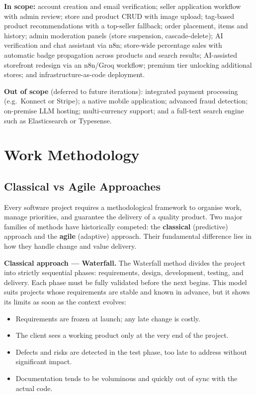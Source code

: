 \documentclass[12pt, a4paper, oneside]{report}
\begin{document}
\noindent\textbf{In scope:} account creation and email verification;
seller application workflow with admin review; store and product
CRUD with image upload; tag-based product recommendations with a
top-seller fallback; order placement, items and history; admin
moderation panels (store suspension, cascade-delete); AI verification and chat assistant via n8n;
store-wide percentage sales with automatic badge propagation across products and search results;
AI-assisted storefront redesign via an n8n/Groq workflow;
premium tier unlocking additional stores; and infrastructure-as-code
deployment.

\medskip
\noindent\textbf{Out of scope} (deferred to future iterations):
integrated payment processing (e.g.\ Konnect or Stripe); a native
mobile application; advanced fraud detection; on-premise LLM
hosting; multi-currency support; and a full-text search engine such
as Elasticsearch or Typesense.

\section{Work Methodology}

\subsection{Classical vs Agile Approaches}

Every software project requires a methodological framework to organise
work, manage priorities, and guarantee the delivery of a quality
product. Two major families of methods have historically competed: the
\textbf{classical} (predictive) approach and the \textbf{agile}
(adaptive) approach. Their fundamental difference lies in how they
handle change and value delivery.

\medskip
\noindent\textbf{Classical approach --- Waterfall.}
The Waterfall method divides the project into strictly sequential
phases: requirements, design, development, testing, and delivery.
Each phase must be fully validated before the next begins. This model
suits projects whose requirements are stable and known in advance, but
it shows its limits as soon as the context evolves:

\begin{itemize}[leftmargin=*,itemsep=2pt]
  \item Requirements are frozen at launch; any late change is costly.
  \item The client sees a working product only at the very end of the project.
  \item Defects and risks are detected in the test phase, too late to
        address without significant impact.
  \item Documentation tends to be voluminous and quickly out of sync
        with the actual code.
\end{itemize}
\end{document}

